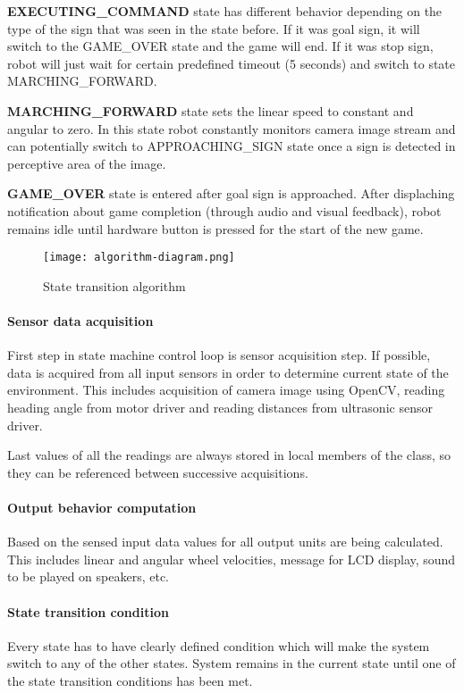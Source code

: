 \textbf{EXECUTING\_COMMAND} state has different behavior depending on the type of the sign that was seen in the state before. If it was goal sign, it will switch to the GAME\_OVER state and the game will end. If it was stop sign, robot will just wait for certain predefined timeout (5 seconds) and switch to state MARCHING\_FORWARD.

\textbf{MARCHING\_FORWARD} state sets the linear speed to constant and angular to zero. In this state robot constantly monitors camera image stream and can potentially switch to APPROACHING\_SIGN state once a sign is detected in perceptive area of the image.

\textbf{GAME\_OVER} state is entered after goal sign is approached. After displaching notification about game completion (through audio and visual feedback), robot remains idle until hardware button is pressed for the start of the new game.

\begin{figure}[th!]
	\centering
	\texttt{[image: algorithm-diagram.png]}
	\caption{State transition algorithm}
	\label{fig:algorithm-diagram}
\end{figure}

\paragraph{Sensor data acquisition}

First step in state machine control loop is sensor acquisition step. If possible, data is acquired from all input sensors in order to determine current state of the environment. This includes acquisition of camera image using OpenCV, reading heading angle from motor driver and reading distances from ultrasonic sensor driver.

Last values of all the readings are always stored in local members of the class, so they can be referenced between successive acquisitions.

\paragraph{Output behavior computation}

Based on the sensed input data values for all output units are being calculated. This includes linear and angular wheel velocities, message for LCD display, sound to be played on speakers, etc.

\paragraph{State transition condition}

Every state has to have clearly defined condition which will make the system switch to any of the other states. System remains in the current state until one of the state transition conditions has been met.




